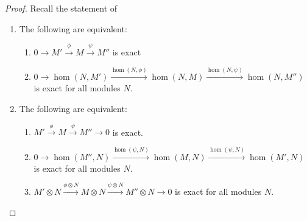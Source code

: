 \begin{proof}
Recall the statement of
\begin{theorem*}[2.12]
\begin{enumerate}[noitemsep,label=(\alph*)]
\item The following are equivalent:
\begin{enumerate}[noitemsep,label=(\arabic*)]
\item $\displaystyle 0\xrightarrow{}
  M'\xrightarrow{\phi}M\xrightarrow{\psi}M''$
  is exact
\item $\displaystyle
  0\xrightarrow{}\hom(N,M')\xrightarrow{\hom(N,\phi)}\hom(N,M)\xrightarrow{\hom(N,\psi)}\hom(N,M'')$
  is exact for all modules $N$.
\end{enumerate}
\item The following are equivalent:
\begin{enumerate}[noitemsep,label=(\arabic*)]
\item $\displaystyle
  M'\xrightarrow{\phi}M\xrightarrow{\psi}M''\xrightarrow{}
  0$ is exact.
\item $\displaystyle
  0\xrightarrow{}\hom(M'',N)\xrightarrow{\hom(\psi,N)}\hom(M,N)\xrightarrow{\hom(\psi,N)}\hom(M',N)$
  is exact for all modules $N$.
\item $\displaystyle M'\otimes N\xrightarrow{\phi\otimes
    N}M\otimes N\xrightarrow{\psi\otimes
    N}M''\otimes N\xrightarrow{} 0$ is exact
  for all modules $N$.
\end{enumerate}
\end{enumerate}
\end{theorem*}
\end{proof}


